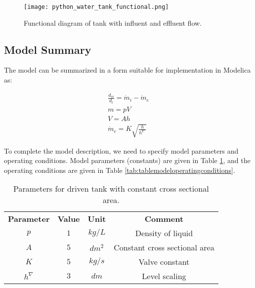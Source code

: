 \begin{figure}
	\texttt{[image: python\_water\_tank\_functional.png]}
	\caption{Functional diagram of tank with influent and effluent flow.}
	\label{fig:pythonwatertankfunctional}
\end{figure}

\subsection{Model Summary}
\label{subsec:pythonmodelsummary}

The model can be summarized in a form suitable for implementation in Modelica as:

\begin{equation*}
	\begin{aligned}
	    \frac{d_m}{d_t} = \dot{m}_i - \dot{m}_e \\
	     m = pV \\
	     V = Ah \\
	     \dot{m}_e = K\sqrt{\frac{h}{h^{\nabla^.}}} 
	\end{aligned}
\end{equation*}

To complete the model description, we need to specify model parameters and operating conditions. Model parameters
(constants) are given in Table \ref{tab:tablemodelparameters}, and the operating conditions are given in Table \ref{tab:tablemodeloperatingconditions}.

\begin{table}
	\begin{center}
		\caption{Parameters for driven tank with constant cross sectional area.} 
		\label{tab:tablemodelparameters} 
		\begin{tabular}{ cccc } 
			\hline
			\bfseries Parameter & \bfseries Value  & \bfseries Unit  & \bfseries Comment \\ 
			$p$ & $1$ & $kg/L $ & Density of liquid \\ 
			$A$ & $5$ & $dm^2$ & Constant cross sectional area \\ 
			$K$ & $5$ & $kg/s$ & Valve constant \\
			$h^{\nabla}$ & $3$ & $dm$ & Level scaling \\  
			\hline
		\end{tabular}
	\end{center}
\end{table}


